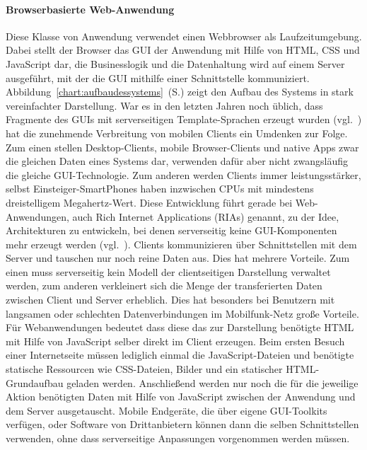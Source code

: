 \paragraph{Browserbasierte Web-Anwendung} Diese Klasse von Anwendung verwendet einen Webbrowser als Laufzeitumgebung. Dabei stellt der Browser das GUI der Anwendung mit Hilfe von HTML, CSS und JavaScript dar, die Businesslogik und die Datenhaltung wird auf einem Server ausgeführt, mit der die GUI mithilfe einer Schnittstelle kommuniziert. Abbildung~\ref{chart:aufbaudessystems}~(S.\pageref{chart:aufbaudessystems}) zeigt den Aufbau des Systems in stark vereinfachter Darstellung. War es in den letzten Jahren noch üblich, dass Fragmente des GUIs mit serverseitigen Template-Sprachen erzeugt wurden (vgl.~\cite[S.48]{dunkel2008systemarchitekturen}) hat die zunehmende Verbreitung von mobilen Clients ein Umdenken zur Folge. Zum einen stellen Desktop-Clients, mobile Browser-Clients und native Apps zwar die gleichen Daten eines Systems dar, verwenden dafür aber nicht zwangsläufig die gleiche GUI-Technologie. Zum anderen werden Clients immer leistungsstärker, selbst Einsteiger-SmartPhones haben inzwischen CPUs mit mindestens dreistelligem Megahertz-Wert. Diese Entwicklung führt gerade bei Web-Anwendungen, auch Rich Internet Applications (RIAs) genannt, zu der Idee, Architekturen zu entwickeln, bei denen serverseitig keine GUI-Komponenten mehr erzeugt werden (vgl.~\cite{maccaw2011javascript}). Clients kommunizieren über Schnittstellen mit dem Server und tauschen nur noch reine Daten aus. Dies hat mehrere Vorteile. Zum einen muss serverseitig kein Modell der clientseitigen Darstellung verwaltet werden, zum anderen verkleinert sich die Menge der transferierten Daten zwischen Client und Server erheblich. Dies hat besonders bei Benutzern mit langsamen oder schlechten Datenverbindungen im Mobilfunk-Netz große Vorteile. Für Webanwendungen bedeutet dass diese das zur Darstellung benötigte HTML mit Hilfe von JavaScript selber direkt im Client erzeugen. Beim ersten Besuch einer Internetseite müssen lediglich einmal die JavaScript-Dateien und benötigte statische Ressourcen wie CSS-Dateien, Bilder und ein statischer HTML-Grundaufbau geladen werden. Anschließend werden nur noch die für die jeweilige Aktion benötigten Daten mit Hilfe von JavaScript zwischen der Anwendung und dem Server ausgetauscht. Mobile Endgeräte, die über eigene GUI-Toolkits verfügen, oder Software von Drittanbietern können dann die selben Schnittstellen verwenden, ohne dass serverseitige Anpassungen vorgenommen werden müssen. 

